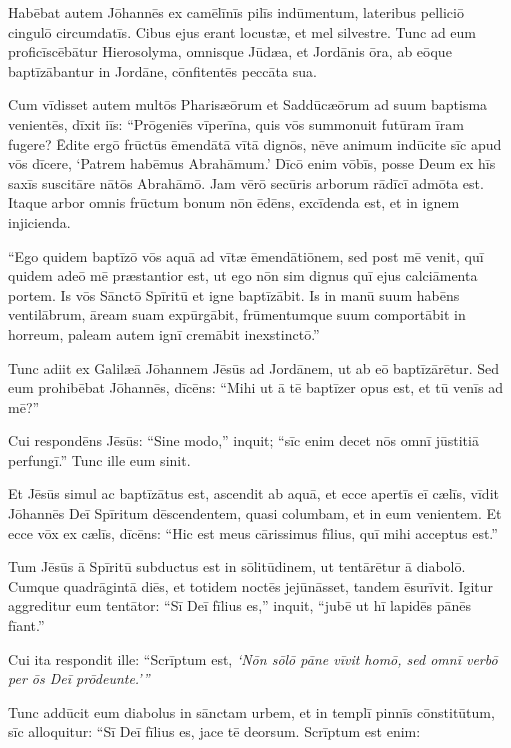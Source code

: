 \Versus Habēbat autem Jōhannēs ex camēlīnīs pilīs indūmentum, lateribus pelliciō cingulō circumdatīs. Cibus ejus erant locustæ, et mel silvestre. 
\Versus Tunc ad eum proficīscēbātur Hierosolyma, omnisque Jūdæa, et Jordānis ōra, 
\Versus ab eōque baptīzābantur in Jordāne, cōnfitentēs peccāta sua.

\Versus Cum vīdisset autem multōs Pharisæōrum et Saddūcæōrum ad suum baptisma venientēs, dīxit iīs: ``Prōgeniēs vīperīna, quis vōs summonuit futūram īram fugere? 
\Versus Ēdite ergō frūctūs ēmendātā vītā dignōs, 
\Versus nēve animum indūcite sīc apud vōs dīcere, `Patrem habēmus Abrahāmum.' Dīcō enim vōbīs, posse Deum ex hīs saxīs suscitāre nātōs Abrahāmō. 
\Versus Jam vērō secūris arborum rādīcī admōta est. Itaque arbor omnis frūctum bonum nōn ēdēns, excīdenda est, et in ignem injicienda.

\Versus ``Ego quidem baptīzō vōs aquā ad vītæ ēmendātiōnem, sed post mē venit, quī quidem adeō mē præstantior est, ut ego nōn sim dignus quī ejus calciāmenta portem. Is vōs Sānctō Spīritū et igne baptīzābit. 
\Versus Is in manū suum habēns ventilābrum, āream suam expūrgābit, frūmentumque suum comportābit in horreum, paleam autem ignī cremābit inexstinctō.''

\Versus Tunc adiit ex Galilæā Jōhannem Jēsūs ad Jordānem, ut ab eō baptīzārētur. 
\Versus Sed eum prohibēbat Jōhannēs, dīcēns: ``Mihi ut ā tē baptīzer opus est, et tū venīs ad mē?'' 

\Versus Cui respondēns Jēsūs: ``Sine modo,'' inquit; ``sīc enim decet nōs omnī jūstitiā perfungī.'' Tunc ille eum sinit. 

\Versus Et Jēsūs simul ac baptīzātus est, ascendit ab aquā, et ecce apertīs eī cælīs, vīdit Jōhannēs Deī Spīritum dēscendentem, quasi columbam, et in eum venientem. 
\Versus Et ecce vōx ex cælīs, dīcēns: ``Hic est meus cārissimus fīlius, quī mihi acceptus est.''
 

\Caput
\Versus Tum Jēsūs ā Spīritū subductus est in sōlitūdinem, ut tentārētur ā diabolō. 
\Versus Cumque quadrāgintā diēs, et totidem noctēs jejūnāsset, tandem ēsurīvit. 
\Versus Igitur aggreditur eum tentātor: ``Sī Deī fīlius es,'' inquit, ``jubē ut hī lapidēs pānēs fīant.'' 

\Versus Cui ita respondit ille: ``Scrīptum est, \emph{`Nōn sōlō pāne vīvit homō, sed omnī verbō per ōs Deī prōdeunte.'{}''}

\Versus Tunc addūcit eum diabolus in sānctam urbem, et in templī pinnīs cōnstitūtum, 
\Versus sīc alloquitur:
``Sī Deī fīlius es, jace tē deorsum. Scrīptum est enim:

